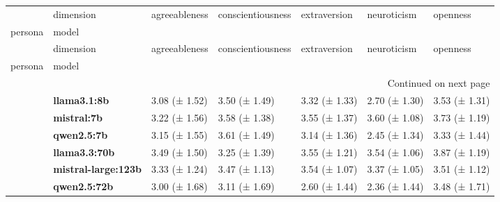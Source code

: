 \begin{longtable}{lllllll}
\toprule
 & dimension & agreeableness & conscientiousness & extraversion & neuroticism & openness \\
persona & model &  &  &  &  &  \\
\midrule
\endfirsthead
\toprule
 & dimension & agreeableness & conscientiousness & extraversion & neuroticism & openness \\
persona & model &  &  &  &  &  \\
\midrule
\endhead
\midrule
\multicolumn{7}{r}{Continued on next page} \\
\midrule
\endfoot
\bottomrule
\endlastfoot
\multirow[t]{6}{*}{\textbf{base}} & \textbf{llama3.1:8b} & 3.08 (± 1.52) & 3.50 (± 1.49) & 3.32 (± 1.33) & 2.70 (± 1.30) & 3.53 (± 1.31) \\
\textbf{} & \textbf{mistral:7b} & 3.22 (± 1.56) & 3.58 (± 1.38) & 3.55 (± 1.37) & 3.60 (± 1.08) & 3.73 (± 1.19) \\
\textbf{} & \textbf{qwen2.5:7b} & 3.15 (± 1.55) & 3.61 (± 1.49) & 3.14 (± 1.36) & 2.45 (± 1.34) & 3.33 (± 1.44) \\
\textbf{} & \textbf{llama3.3:70b} & 3.49 (± 1.50) & 3.25 (± 1.39) & 3.55 (± 1.21) & 3.54 (± 1.06) & 3.87 (± 1.19) \\
\textbf{} & \textbf{mistral-large:123b} & 3.33 (± 1.24) & 3.47 (± 1.13) & 3.54 (± 1.07) & 3.37 (± 1.05) & 3.51 (± 1.12) \\
\textbf{} & \textbf{qwen2.5:72b} & 3.00 (± 1.68) & 3.11 (± 1.69) & 2.60 (± 1.44) & 2.36 (± 1.44) & 3.48 (± 1.71) \\
\cline{1-7}
\end{longtable}
